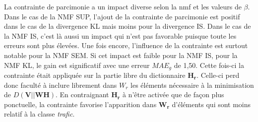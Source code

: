 \begin{table}[h!]
\centering
\caption{Erreurs $MAE_{60}$ pour les combinaisons optimales des modalités des estimateurs pour le corpus d'évaluation \textit{SOUR} en présence d'une pondération de parcimonie.}
\label{tab:erreur_sparse}
\end{table}

La contrainte de parcimonie a un impact diverse selon la nmf et les valeurs de $\beta$. Dans le cas de la NMF SUP, l'ajout de la contrainte de parcimonie est positif dans le cas de la divergence KL mais moins pour la divergence IS. 
Dans le cas de la NMF IS, c'est là aussi un impact qui n'est pas favorable puisque toute les erreurs sont plus élevées.
Une fois encore, l'influence de la contrainte est surtout notable pour la NMF SEM. Si cet impact est faible pour la NMF IS, pour la NMF KL, le gain est significatif avec une erreur $MAE_g$ de 1,50. Cette fois-ci la contrainte était appliquée sur la partie libre du dictionnaire $\mathbf{H_r}$. Celle-ci perd donc faculté à inclure librement dans $W_r$ les éléments nécessaire à la minimisation de $D\left(\textbf{V} \vert\vert \textbf{WH}\right)$. En contraignant $\mathbf{H_r}$ à n'être activée que de façon plus ponctuelle, la contrainte favorise l'apparition dans $\mathbf{W_r}$ d'éléments qui sont moins relatif à la classe \textit{trafic}.


